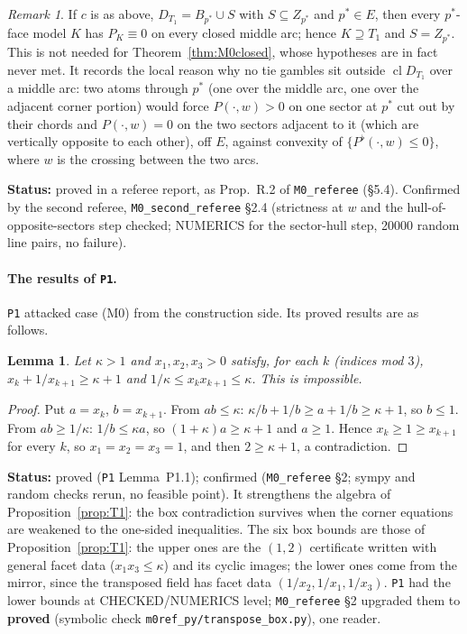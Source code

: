 \documentclass[11pt]{article}
\newtheorem{lemma}[theorem]{Lemma}
\theoremstyle{definition}
\theoremstyle{remark}
\newtheorem{remark}[theorem]{Remark}
\newcommand{\cl}{\operatorname{cl}}
\newcommand{\src}[1]{\texttt{#1}}
\newcommand{\status}[1]{\par\smallskip\noindent\textbf{Status:} #1\par\smallskip}
\begin{document}
\begin{remark}\label{rem:midarc}
If $c$ is as above, $D_{T_1}=B_{p^*}\cup S$ with $S\subseteq Z_{p^*}$ and $p^*\in E$, then every $p^*$-face model $K$ has $P_K\equiv0$ on every closed middle arc; hence $K\supseteq T_1$ and $S=Z_{p^*}$. This is not needed for Theorem~\ref{thm:M0closed}, whose hypotheses are in fact never met. It records the local reason why no tie gambles sit outside $\cl D_{T_1}$ over a middle arc: two atoms through $p^*$ (one over the middle arc, one over the adjacent corner portion) would force $P(\cdot,w)>0$ on one sector at $p^*$ cut out by their chords and $P(\cdot,w)=0$ on the two sectors adjacent to it (which are vertically opposite to each other), off $E$, against convexity of $\{P^\flat(\cdot,w)\le0\}$, where $w$ is the crossing between the two arcs.
\end{remark}
\status{proved in a referee report, as Prop.~R.2 of \src{M0\_referee} (\S5.4). Confirmed by the second referee, \src{M0\_second\_referee} \S2.4 (strictness at $w$ and the hull-of-opposite-sectors step checked; NUMERICS for the sector-hull step, 20000 random line pairs, no failure).}

\paragraph{The results of \src{P1}.} \src{P1} attacked case (M0) from the construction side. Its proved results are as follows.

\begin{lemma}\label{lem:P1box}
Let $\kappa>1$ and $x_1,x_2,x_3>0$ satisfy, for each $k$ (indices mod $3$), $x_k+1/x_{k+1}\ge\kappa+1$ and $1/\kappa\le x_kx_{k+1}\le\kappa$. This is impossible.
\end{lemma}
\begin{proof}
Put $a=x_k$, $b=x_{k+1}$. From $ab\le\kappa$: $\kappa/b+1/b\ge a+1/b\ge\kappa+1$, so $b\le1$. From $ab\ge1/\kappa$: $1/b\le\kappa a$, so $(1+\kappa)a\ge\kappa+1$ and $a\ge1$. Hence $x_k\ge1\ge x_{k+1}$ for every $k$, so $x_1=x_2=x_3=1$, and then $2\ge\kappa+1$, a contradiction.
\end{proof}
\status{proved (\src{P1} Lemma~P1.1); confirmed (\src{M0\_referee} \S2; sympy and random checks rerun, no feasible point). It strengthens the algebra of Proposition~\ref{prop:T1}: the box contradiction survives when the corner equations are weakened to the one-sided inequalities. The six box bounds are those of Proposition~\ref{prop:T1}: the upper ones are the $(1,2)$ certificate written with general facet data ($x_1x_3\le\kappa$) and its cyclic images; the lower ones come from the mirror, since the transposed field has facet data $(1/x_2,1/x_1,1/x_3)$. \src{P1} had the lower bounds at CHECKED/NUMERICS level; \src{M0\_referee} \S2 upgraded them to \textbf{proved} (symbolic check \src{m0ref\_py/transpose\_box.py}), one reader.}
\end{document}
